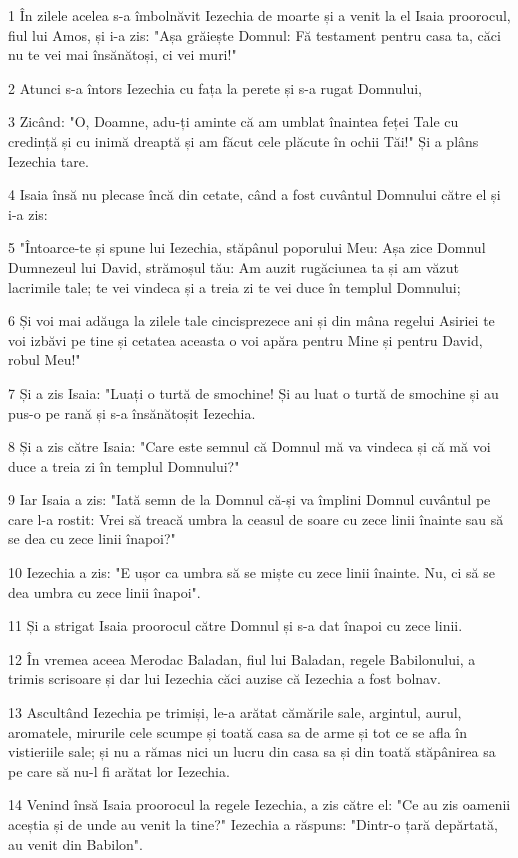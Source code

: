 \par 1 În zilele acelea s-a îmbolnăvit Iezechia de moarte și a venit la el Isaia proorocul, fiul lui Amos, și i-a zis: "Așa grăiește Domnul: Fă testament pentru casa ta, căci nu te vei mai însănătoși, ci vei muri!"
\par 2 Atunci s-a întors Iezechia cu fața la perete și s-a rugat Domnului,
\par 3 Zicând: "O, Doamne, adu-ți aminte că am umblat înaintea feței Tale cu credință și cu inimă dreaptă și am făcut cele plăcute în ochii Tăi!" Și a plâns Iezechia tare.
\par 4 Isaia însă nu plecase încă din cetate, când a fost cuvântul Domnului către el și i-a zis:
\par 5 "Întoarce-te și spune lui Iezechia, stăpânul poporului Meu: Așa zice Domnul Dumnezeul lui David, strămoșul tău: Am auzit rugăciunea ta și am văzut lacrimile tale; te vei vindeca și a treia zi te vei duce în templul Domnului;
\par 6 Și voi mai adăuga la zilele tale cincisprezece ani și din mâna regelui Asiriei te voi izbăvi pe tine și cetatea aceasta o voi apăra pentru Mine și pentru David, robul Meu!"
\par 7 Și a zis Isaia: "Luați o turtă de smochine! Și au luat o turtă de smochine și au pus-o pe rană și s-a însănătoșit Iezechia.
\par 8 Și a zis către Isaia: "Care este semnul că Domnul mă va vindeca și că mă voi duce a treia zi în templul Domnului?"
\par 9 Iar Isaia a zis: "Iată semn de la Domnul că-și va împlini Domnul cuvântul pe care l-a rostit: Vrei să treacă umbra la ceasul de soare cu zece linii înainte sau să se dea cu zece linii înapoi?"
\par 10 Iezechia a zis: "E ușor ca umbra să se miște cu zece linii înainte. Nu, ci să se dea umbra cu zece linii înapoi".
\par 11 Și a strigat Isaia proorocul către Domnul și s-a dat înapoi cu zece linii.
\par 12 În vremea aceea Merodac Baladan, fiul lui Baladan, regele Babilonului, a trimis scrisoare și dar lui Iezechia căci auzise că Iezechia a fost bolnav.
\par 13 Ascultând Iezechia pe trimiși, le-a arătat cămările sale, argintul, aurul, aromatele, mirurile cele scumpe și toată casa sa de arme și tot ce se afla în vistieriile sale; și nu a rămas nici un lucru din casa sa și din toată stăpânirea sa pe care să nu-l fi arătat lor Iezechia.
\par 14 Venind însă Isaia proorocul la regele Iezechia, a zis către el: "Ce au zis oamenii aceștia și de unde au venit la tine?" Iezechia a răspuns: "Dintr-o țară depărtată, au venit din Babilon".
